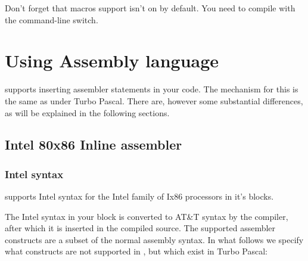 \begin{remark}Don't forget that macros support isn't on by default. You
need to compile with the  command-line switch.
\end{remark}

\chapter{Using Assembly language}
\label{ch:AsmLang}
\fpc supports inserting assembler statements in your code. The
mechanism for this is the same as under Turbo Pascal. There are, however
some substantial differences, as will be explained in the following
sections.

\section{Intel 80x86 Inline assembler}

\subsection{Intel syntax}
\label{se:Intel}

\fpc supports Intel syntax for the Intel family of Ix86 processors
in it's  blocks.

The Intel syntax in your  block is converted to AT\&T syntax by the
compiler, after which it is inserted in the compiled source.
The supported assembler constructs are a subset of the normal assembly
syntax. In what follows we specify what constructs are not supported in
\fpc, but which exist in Turbo Pascal:

